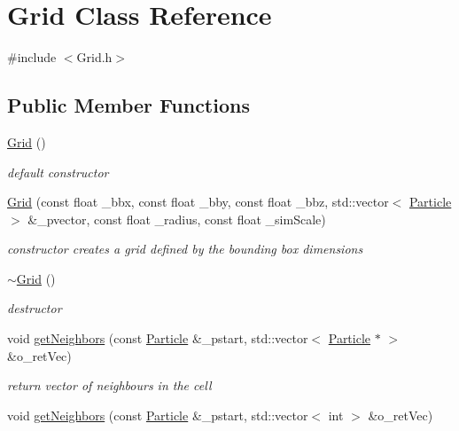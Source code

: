 \hypertarget{classGrid}{
\section{Grid Class Reference}
\label{classGrid}
}


{\ttfamily \#include $<$Grid.h$>$}\subsection*{Public Member Functions}
\begin{DoxyCompactItemize}
\item 
\hyperlink{classGrid_a4ac9ff4f63552b4c61ff90fcb35ad66c}{Grid} ()
\begin{DoxyCompactList}\small\item\em default constructor \item\end{DoxyCompactList}\item 
\hyperlink{classGrid_ab1c364659f2e78f3066a27595f146117}{Grid} (const float \_\-bbx, const float \_\-bby, const float \_\-bbz, std::vector$<$ \hyperlink{classParticle}{Particle} $>$ \&\_\-pvector, const float \_\-radius, const float \_\-simScale)
\begin{DoxyCompactList}\small\item\em constructor creates a grid defined by the bounding box dimensions \item\end{DoxyCompactList}\item 
\hyperlink{classGrid_a3661d0a7f998caaaf8627d7a67072116}{$\sim$Grid} ()
\begin{DoxyCompactList}\small\item\em destructor \item\end{DoxyCompactList}\item 
void \hyperlink{classGrid_a4f593e269e61cdbb9d3057269120e432}{getNeighbors} (const \hyperlink{classParticle}{Particle} \&\_\-pstart, std::vector$<$ \hyperlink{classParticle}{Particle} $\ast$ $>$ \&o\_\-retVec)
\begin{DoxyCompactList}\small\item\em return vector of neighbours in the cell \item\end{DoxyCompactList}\item 
void \hyperlink{classGrid_a1e904362638c9c3f83f6a14fe553f868}{getNeighbors} (const \hyperlink{classParticle}{Particle} \&\_\-pstart, std::vector$<$ int $>$ \&o\_\-retVec)

\end{DoxyCompactItemize}
